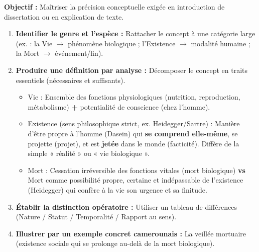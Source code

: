 \documentclass[11pt]{article}
\newcommand{\cle}[1]{{\popxbold\color{popdark}#1}}
\begin{document}
\begin{methode}
\textbf{Objectif :} Maîtriser la précision conceptuelle exigée en introduction de dissertation ou en explication de texte.
\begin{enumerate}
    \item \textbf{Identifier le genre et l'espèce :} Rattacher le concept à une catégorie large (ex. : la Vie $\to$ phénomène biologique ; l'Existence $\to$ modalité humaine ; la Mort $\to$ événement/fin).
    \item \textbf{Produire une définition par analyse :} Décomposer le concept en traits essentiels (nécessaires et suffisants).
    \begin{itemize}
        \item \cle{Vie} : Ensemble des fonctions physiologiques (nutrition, reproduction, métabolisme) \textbf{+} potentialité de conscience (chez l'homme).
        \item \cle{Existence} (sens philosophique strict, ex. Heidegger/Sartre) : Manière d'être propre à l'homme (Dasein) qui \textbf{se comprend elle-même}, se projette (projet), et est \textbf{jetée} dans le monde (facticité). Diffère de la simple « réalité » ou « vie biologique ».
        \item \cle{Mort} : Cessation irréversible des fonctions vitales (mort biologique) \textbf{vs} Mort comme \cle{possibilité propre, certaine et indépassable} de l'existence (Heidegger) qui confère à la vie son urgence et sa finitude.
    \end{itemize}
    \item \textbf{Établir la distinction opératoire :} Utiliser un tableau de différences (Nature / Statut / Temporalité / Rapport au sens).
    \item \textbf{Illustrer par un exemple concret camerounais :} La veillée mortuaire (existence sociale qui se prolonge au-delà de la mort biologique).
\end{enumerate}
\end{methode}
\end{document}
